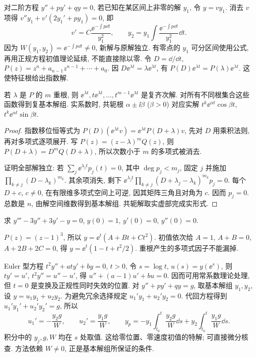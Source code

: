 对二阶方程 $y''+p y'+q y=0$, 若已知在某区间上非零的解 $y_1$, 令 $y=v y_1$. 消去 $v$ 项得 $v''y_1+v'(2y_1'+py_1)=0$, 即
\[
v'=C\frac{\ee^{-\int p\dd t}}{y_1^2},\qquad
 y_2=y_1\int\frac{\ee^{-\int p\dd t}}{y_1^2}\dd t.
\]
因为 $W(y_1,y_2)=\ee^{-\int p\dd t}\ne0$, 新解与原解独立. 有零点的 $y_1$ 可分区间使用公式, 再用正规方程初值理论延续, 不能直接除以零.
令 $D=\dd/\dd t$, $P(z)=z^n+a_{n-1}z^{n-1}+\cdots+a_0$. 因 $D\ee^{\lambda t}=\lambda\ee^{\lambda t}$, 有 $P(D)\ee^{\lambda t}=P(\lambda)\ee^{\lambda t}$. 这使特征根给出指数解.
\begin{theorem}
若 $\lambda$ 是 $P$ 的 $m$ 重根, 则 $\ee^{\lambda t},t\ee^{\lambda t},\ldots,t^{m-1}\ee^{\lambda t}$ 是复齐次解. 对所有不同根集合这些函数得到复基本解组. 实系数时, 共轭根 $\alpha\pm\ii\beta$ ($\beta>0$) 对应实解 $t^k\ee^{\alpha t}\cos\beta t$, $t^k\ee^{\alpha t}\sin\beta t$.
\end{theorem}
\begin{proof}
指数移位恒等式为 $P(D)(\ee^{\lambda t}v)=\ee^{\lambda t}P(D+\lambda)v$, 先对 $D$ 用乘积法则, 再对多项式逐项展开. 写 $P(z)=(z-\lambda)^m Q(z)$, 则 $P(D+\lambda)=D^mQ(D+\lambda)$, 所以次数小于 $m$ 的多项式被消去.

证明全部解独立: 若 $\sum_j\ee^{\lambda_j t}p_j(t)=0$, 其中 $\deg p_j<m_j$, 固定 $j$ 并施加 $\prod_{k\ne j}(D-\lambda_k)^{m_k}$. 其余项消失, 剩下 $\ee^{\lambda_jt}\prod_{k\ne j}(D+\lambda_j-\lambda_k)^{m_k}p_j=0$. 每个 $D+c$, $c\ne0$, 在有限维多项式空间上可逆, 因其矩阵三角且对角为 $c$. 因而 $p_j=0$. 总数是 $n$, 由解空间维数得到基本解组. 共轭解取实虚部完成实形式.
\end{proof}
\begin{example}求 $y'''-3y''+3y'-y=0$, $y(0)=1$, $y'(0)=0$, $y''(0)=0$.\end{example}
\begin{solution}
$P(z)=(z-1)^3$, 所以 $y=\ee^t(A+Bt+Ct^2)$. 初值依次给 $A=1$, $A+B=0$, $A+2B+2C=0$, 得 $y=\ee^t(1-t+t^2/2)$. 重根产生的多项式因子不能漏掉.
\end{solution}
Euler 型方程 $t^2y''+at y'+by=0$, $t>0$, 令 $s=\log t$, $u(s)=y(\ee^s)$, 则 $ty'=u'$, $t^2y''=u''-u'$, 得 $u''+(a-1)u'+bu=0$. 因而可用常系数理论处理, 但 $t=0$ 是变换及正规性同时失效的位置.
对 $y''+py'+qy=g$, 取基本解组 $y_1,y_2$, 设 $y=u_1y_1+u_2y_2$. 为避免冗余选择规定 $u_1'y_1+u_2'y_2=0$. 代回方程得到 $u_1'y_1'+u_2'y_2'=g$, 所以
\[
u_1'=-\frac{y_2g}{W},\qquad u_2'=\frac{y_1g}{W},\qquad
 y_p=-y_1\int_{t_0}^t\frac{y_2g}{W}\dd s+y_2\int_{t_0}^t\frac{y_1g}{W}\dd s.
\]
积分中的 $y_j,g,W$ 均在 $s$ 处取值. 这给零位置、零速度初值的特解; 可直接微分核查. 方法依赖 $W\ne0$, 正是基本解组所保证的条件.
